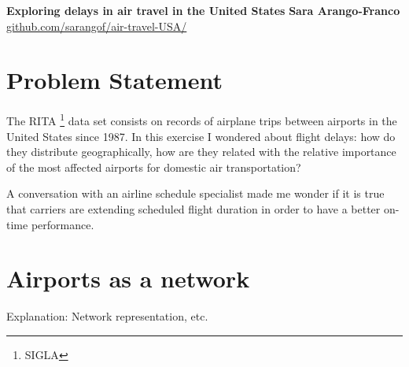 \documentclass[a4paper, 11pt]{article}
\begin{document}
\noindent
\large\textbf{Exploring delays in air travel in the United States} \hfill \textbf{Sara Arango-Franco} \\
\normalsize \url{github.com/sarangof/air-travel-USA/} 

\section*{Problem Statement}
The RITA \footnote{SIGLA} data set consists on records of airplane trips between airports in the United States since 1987. In this exercise I wondered about flight delays: how do they distribute geographically, how are they related with the relative importance of the most affected airports for domestic air transportation? 

A conversation with an airline schedule specialist made me wonder if it is true that carriers are extending scheduled flight duration in order to have a better on-time performance. 

\section*{Airports as a network}


Explanation: Network representation, etc.


\end{document}
